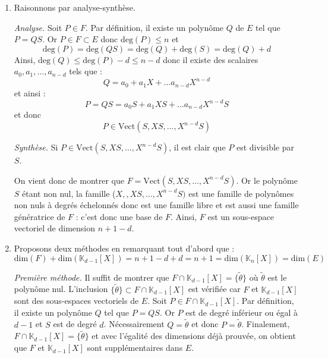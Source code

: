 \documentclass[a4paper,10pt]{report}
\begin{document}
\corr \begin{enumerate}
\item Raisonnons par analyse-synthèse.

\medskip

\noindent \textit{Analyse.} Soit $P \in F$. Par définition, il existe un polynôme $Q$ de $E$ tel que $P=QS$. Or $P \in F \subset E$ donc $\textrm{deg}(P) \leq n$ et 
$$ \textrm{deg}(P) = \textrm{deg}(QS) = \textrm{deg}(Q) + \textrm{deg}(S) = \textrm{deg}(Q) + d$$
Ainsi, $\textrm{deg}(Q) \leq \textrm{deg}(P) - d \leq n-d$ donc il existe des scalaires $a_0, a_1, \ldots, a_{n-d}$ tels que :
$$ Q = a_0 + a_1X+ \ldots a_{n-d} X^{n-d}$$
et ainsi :
$$ P = QS = a_0 S + a_1XS+ \ldots a_{n-d} X^{n-d}S$$
et donc 
$$ P \in \textrm{Vect}(S,XS,\ldots, X^{n-d}S)$$

\medskip

\noindent \textit{Synthèse.} Si $P \in \textrm{Vect}(S,XS,\ldots, X^{n-d}S)$, il est clair que $P$ est divisible par $S$.

\medskip

\noindent On vient donc de montrer que $F= \textrm{Vect}(S,XS,\ldots, X^{n-d}S)$. Or le polynôme $S$ étant non nul, la famille ($X,,XS,\ldots, X^{n-d}S)$ est une famille de polynômes non nuls à degrés échelonnés donc est une famille libre et est aussi une famille génératrice de $F$ : c'est donc une base de $F$. Ainsi, $F$ est un sous-espace vectoriel de dimension $n+1-d$.
\item Proposons deux méthodes en remarquant tout d'abord que :
$$ \textrm{dim}(F) + \textrm{dim}(\mathbb{K}_{d-1}[X]) = n+1-d +d = n+1 =  \textrm{dim}(\mathbb{K}_{n}[X]) =  \textrm{dim}(E)$$

\medskip

\noindent \textit{Première méthode.}  Il suffit de montrer que $F \cap \mathbb{K}_{d-1}[X] =\lbrace \tilde{\theta} \rbrace$ où $\tilde{\theta}$ est le polynôme nul. L'inclusion  $\lbrace \tilde{\theta} \rbrace \subset F \cap \mathbb{K}_{d-1}[X]$ est vérifiée car $F$ et $\mathbb{K}_{d-1}[X]$ sont des sous-espaces vectoriels de $E$. Soit $P \in F \cap \mathbb{K}_{d-1}[X]$. Par définition, il existe un polynôme $Q$ tel que $P = QS$. Or $P$ est de degré inférieur ou égal à $d-1$ et $S$ est de degré $d$. Nécessairement $Q= \tilde{\theta}$ et donc $P= \tilde{\theta}$. Finalement, $F \cap \mathbb{K}_{d-1}[X] = \lbrace  \tilde{\theta} \rbrace$ et avec l'égalité des dimensions déjà prouvée, on obtient que $F$ et $\mathbb{K}_{d-1}[X]$ sont supplémentaires dans $E$.

\medskip


\end{enumerate}
\end{document}
